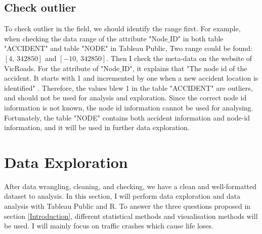 \documentclass[10pt]{article}
\theoremstyle{definition}
\begin{document}
\subsection{Check outlier}
To check outlier in the field, we should identify the range first. For example, when checking the data range of the attribute "Node$\_$ID" in both table "ACCIDENT" and table "NODE" in Tableau Public, Two range could be found: $[4,\,342850]$ and $[-10,\,342850]$. Then I check the meta-data on the website of VicRoads. For the attribute of "Node$\_$ID", it explains that "The node id of the accident. It starts with 1 and incremented by one when a new accident location is identified" \cite{MetaData}. Therefore, the values blew 1 in the table "ACCIDENT" are outliers, and should not be used for analysis and exploration. Since the correct node id information is not known, the node id information cannot be used for analysing. Fortunately, the table "NODE" contains both accident information and node-id information, and it will be used in further data exploration. \par

\section{Data Exploration}
\label{dataExploration}
After data wrangling, cleaning, and checking, we have a clean and well-formatted dataset to analysis. In this section, I will perform data exploration and data analysis with Tableau Public and R. To answer the three questions proposed in section \ref{Introduction}, different statistical methods and visualisation methods will be used. I will mainly focus on traffic crashes which cause life loses. \par
\end{document}
